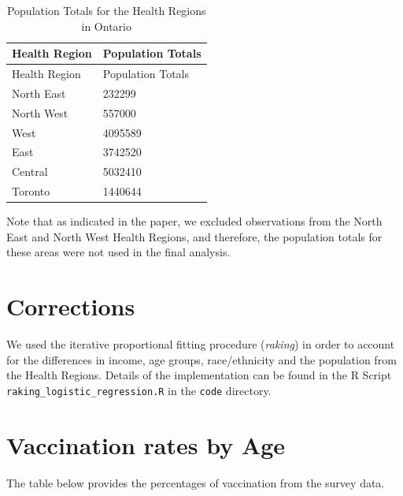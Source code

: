 \documentclass[
  letterpaper,
  DIV=11,
  numbers=noendperiod]{scrartcl}
\begin{document}
\hypertarget{tbl-health-regions}{}
\begin{longtable}[]{@{}ll@{}}
\caption{\label{tbl-health-regions}Population Totals for the Health
Regions in Ontario}\tabularnewline
\toprule()
Health Region & Population Totals \\
\midrule()
\endfirsthead
\toprule()
Health Region & Population Totals \\
\midrule()
\endhead
North East & 232299 \\
North West & 557000 \\
West & 4095589 \\
East & 3742520 \\
Central & 5032410 \\
Toronto & 1440644 \\
\bottomrule()
\end{longtable}

Note that as indicated in the paper, we excluded observations from the
North East and North West Health Regions, and therefore, the population
totals for these areas were not used in the final analysis.

\hypertarget{corrections}{%
\section{Corrections}\label{corrections}}

We used the iterative proportional fitting procedure (\emph{raking}) in
order to account for the differences in income, age groups,
race/ethnicity and the population from the Health Regions. Details of
the implementation can be found in the R Script
\texttt{raking\_logistic\_regression.R} in the \texttt{code} directory.

\hypertarget{vaccination-rates-by-age}{%
\section{Vaccination rates by Age}\label{vaccination-rates-by-age}}

The table below provides the percentages of vaccination from the survey
data.
\end{document}
